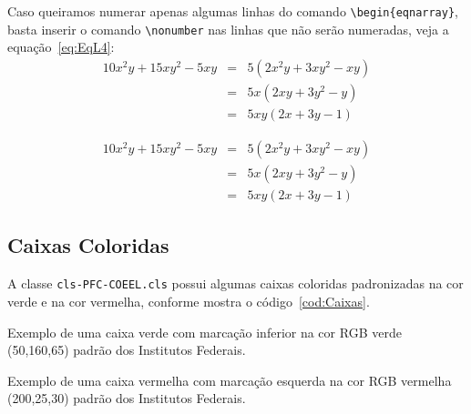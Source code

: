 Caso queiramos numerar apenas algumas linhas do comando \verb|\begin{eqnarray}|, basta inserir o comando \verb|\nonumber| nas linhas que não serão numeradas, veja a equação~\ref{eq:EqL4}:
%
\begin{eqnarray}
    10x^2y+15xy^2-5xy   & = & 5(2x^2y+3xy^2-xy) \nonumber \\
                        & = & 5x(2xy+3y^2-y)    \nonumber \\
    \label{eq:EqL4}
                        & = & 5xy(2x+3y-1)
\end{eqnarray}

\begin{Codigo}[language=tex, 
    caption=Comando eqnarray com somente uma equação numerada, 
    label=cod:EqnarrayNonumber]
  \begin{eqnarray}
    10x^2y+15xy^2-5xy   & = & 5(2x^2y+3xy^2-xy) \nonumber \\
                        & = & 5x(2xy+3y^2-y)    \nonumber \\
    \label{eq:EqL4}
                        & = & 5xy(2x+3y-1)
  \end{eqnarray}
\end{Codigo}



\subsection{Caixas Coloridas}

A classe \verb|cls-PFC-COEEL.cls| possui algumas caixas coloridas padronizadas na cor verde e na cor vermelha, conforme mostra o código~\ref{cod:Caixas}.

\vspace{5mm}
\begin{CaixaVerde}
    Exemplo de uma caixa verde com marcação inferior na cor RGB verde (50,160,65) padrão dos Institutos Federais.
\end{CaixaVerde}

\vspace{5mm}
\begin{CaixaVermelha}
    Exemplo de uma caixa vermelha com marcação esquerda na cor RGB vermelha (200,25,30) padrão dos Institutos Federais.
\end{CaixaVermelha}

\clearpage\newpage\pagebreak

